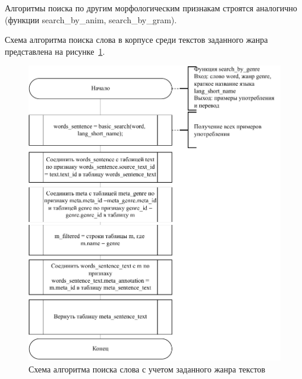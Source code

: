 Алгоритмы поиска по другим морфологическим признакам строятся аналогично (функции search\_by\_anim, search\_by\_gram).
\clearpage

Схема алгоритма поиска слова в корпусе среди текстов заданного жанра представлена на рисунке~\ref{genre-search}.

\begin{figure}[ht]
	\centering
	\includegraphics[scale=1]{img/search-algo-genre.pdf}
	\caption{Схема алгоритма поиска слова с учетом заданного жанра текстов}
	\label{genre-search}
\end{figure}
\clearpage




